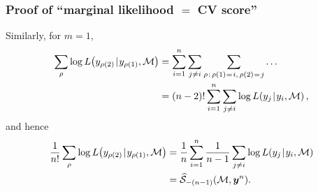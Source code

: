 \documentclass[18pt, handout]{beamer}
\newcommand{\defineTightSpacing}{%
	\setlength{\abovedisplayskip}{.25\baselineskip}%
	\setlength{\belowdisplayskip}{.25\baselineskip}%
}
\newcommand{\given}{\thinnerspace | \thinnerspace}
\newcommand{\spacedEq}{\mkern 1mu = \mkern 1.5mu}
\newcommand{\thinnerspace}{\mskip.5\thinmuskip}
\newcommand{\likelihood}{L}
\newcommand{\by}{\bm{y}}
\newcommand{\score}{\mathcal{S}}
\newcommand{\modelSymbol}{\mathcal{M}}
\newcommand{\permutation}{\rho}
\newcommand{\testSampleIndex}{i}
\begin{document}
\begin{frame}
\frametitle{Proof of ``marginal likelihood $=$ {\large CV} score''}
Similarly, for $m = 1$,  
\begin{equation*} \defineTightSpacing%
\begin{aligned}
\sum_\permutation \log \likelihood\!\left(y_{\permutation(2)} \given y_{\permutation(1)}, \modelSymbol \right) 
	& = \sum_{\testSampleIndex = 1}^n \sum_{j \neq \testSampleIndex} \sum_{\permutation \thinnerspace : \, \permutation(1) \spacedEq i, \, \permutation(2) \spacedEq j} \ldots \\
	&= (n - 2)! \sum_{\testSampleIndex = 1}^n \sum_{j \neq \testSampleIndex} \log \likelihood\!\left(y_j \given y_\testSampleIndex, \modelSymbol \right),
\end{aligned}
\end{equation*}
and hence
\begin{equation*} \defineTightSpacing%
\begin{aligned}
\frac{1}{n!} \sum_\permutation
	 \log \likelihood\!\left(y_{\permutation(2)} \given y_{\permutation(1)}, \modelSymbol \right)
	&= \frac{1}{n} \sum_{\testSampleIndex = 1}^n \frac{1}{n - 1} \sum_{j \neq \testSampleIndex} \log \likelihood\!\left(y_j \given y_\testSampleIndex, \modelSymbol \right) \\
	&= \widehat{\score}_{-(n - 1)}(\modelSymbol, \by^n).
\end{aligned}
\end{equation*}
\end{frame}
\end{document}
